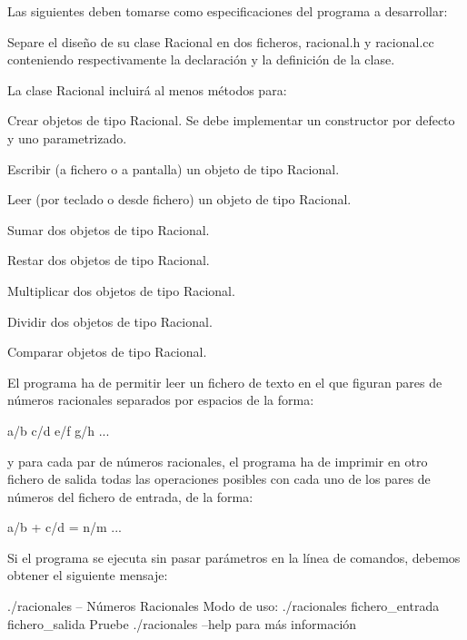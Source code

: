Las siguientes deben tomarse como especificaciones del programa a desarrollar\+:
\begin{DoxyItemize}
\item Separe el diseño de su clase {\ttfamily Racional} en dos ficheros, {\ttfamily racional.\+h} y {\ttfamily racional.\+cc} conteniendo respectivamente la declaración y la definición de la clase.
\item La clase {\ttfamily Racional} incluirá al menos métodos para\+:
\begin{DoxyItemize}
\item Crear objetos de tipo {\ttfamily Racional}. Se debe implementar un constructor por defecto y uno parametrizado.
\item Escribir (a fichero o a pantalla) un objeto de tipo {\ttfamily Racional}.
\item Leer (por teclado o desde fichero) un objeto de tipo {\ttfamily Racional}.
\item Sumar dos objetos de tipo {\ttfamily Racional}.
\item Restar dos objetos de tipo {\ttfamily Racional}.
\item Multiplicar dos objetos de tipo {\ttfamily Racional}.
\item Dividir dos objetos de tipo {\ttfamily Racional}.
\item Comparar objetos de tipo {\ttfamily Racional}.
\end{DoxyItemize}
\item El programa ha de permitir leer un fichero de texto en el que figuran pares de números racionales separados por espacios de la forma\+:
\end{DoxyItemize}


\begin{DoxyCode}
a/b c/d
e/f g/h
  ...
\end{DoxyCode}


y para cada par de números racionales, el programa ha de imprimir en otro fichero de salida todas las operaciones posibles con cada uno de los pares de números del fichero de entrada, de la forma\+:


\begin{DoxyCode}
a/b + c/d = n/m
  ...
\end{DoxyCode}


Si el programa se ejecuta sin pasar parámetros en la línea de comandos, debemos obtener el siguiente mensaje\+:


\begin{DoxyCode}
./racionales -- Números Racionales
Modo de uso: ./racionales fichero\_entrada fichero\_salida
Pruebe ./racionales --help para más información
\end{DoxyCode}


